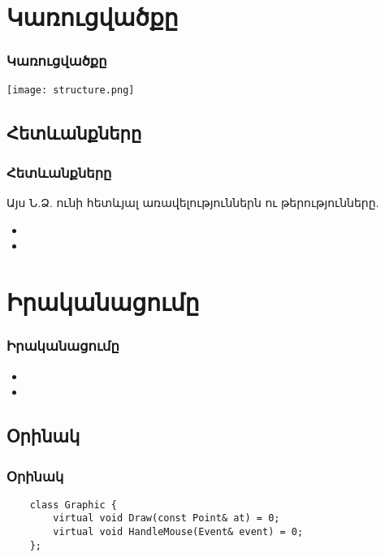 \documentclass{beamer}
\begin{document}
\section{Կառուցվածքը}
\begin{frame}\frametitle{Կառուցվածքը}
\begin{center}
    \texttt{[image: structure.png]}
\end{center}
\end{frame}

\subsection{Հետևանքները}
\begin{frame}\frametitle{Հետևանքները}
Այս Ն.Ձ. ունի հետևյալ առավելություններն ու թերությունները.
\vspace{0.5cm}
\begin{itemize}
    \item
    \item
\end{itemize}
\end{frame}

\section{Իրականացումը}
\begin{frame}\frametitle{Իրականացումը}
\begin{itemize}
    \item
    \item
\end{itemize}
\end{frame}

\subsection{Օրինակ}
\begin{frame}[fragile]\frametitle{Օրինակ}
\begin{english}
\begin{verbatim}
    class Graphic {
        virtual void Draw(const Point& at) = 0;
        virtual void HandleMouse(Event& event) = 0;
    };
\end{verbatim}
\end{english}
\end{frame}
\end{document}

